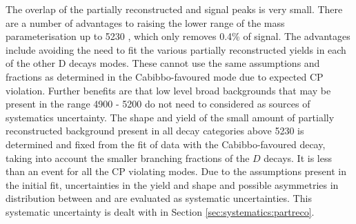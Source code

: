 The overlap of the partially reconstructed and signal peaks is very small. There are a number of advantages to raising the lower range of the mass parameterisation up to 5230 \mev, which only removes 0.4\% of signal. The advantages include avoiding the need to fit the various partially reconstructed yields in each of the other D decays modes. These cannot use the same assumptions and fractions as determined in the Cabibbo-favoured mode due to expected CP violation. Further benefits are that low level broad backgrounds that may be present in the range 4900 - 5200 \mev do not need to considered as sources of systematics uncertainty. The shape and yield of the small amount of partially reconstructed background present in all \D decay categories above 5230 \mev is determined and fixed from the fit of data with the Cabibbo-favoured decay, taking into account the smaller branching fractions of the $D$ decays. It is less than an event for all the CP violating modes. Due to the assumptions present in the initial fit, uncertainties in the yield and shape and possible asymmetries in distribution between \Bp and \Bm are evaluated as systematic uncertainties. This systematic uncertainty is dealt with in Section \ref{sec:systematics:partreco}.


\clearpage
